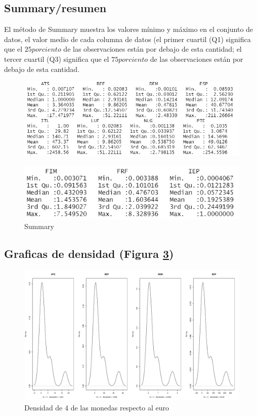 \documentclass[12pt,a4paper]{article}
\begin{document}
\subsection{Summary/resumen}
El método de Summary muestra los valores mínimo y máximo en el conjunto de datos, el valor medio de cada columna de datos (el primer cuartil (Q1) significa que el $ 25 porciento $ de las observaciones están por debajo de esta cantidad; el tercer cuartil (Q3) significa que el $ 75 porciento $ de las observaciones están por debajo de esta cantidad.
\begin{figure}
\centering
\includegraphics[scale=.8]{S1}
\label{fig:S1}
\end{figure}
\begin{figure}
\centering
\includegraphics[scale=.8]{S2}
\caption{Summary}
\label{fig:S2}
\end{figure}
\newpage
\subsection{Graficas de densidad (Figura \ref{fig:G2})}
\begin{figure}
\centering
\includegraphics[scale=.5]{G2}
\caption{Densidad de 4 de las monedas respecto al euro}
\label{fig:G2}
\end{figure}
\newpage
\end{document}
